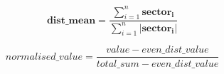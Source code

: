 \documentclass[12pt]{article}
\begin{document}
\begin{equation}
\boldsymbol{dist\_mean} = \frac{\sum_{i=1}^{n} \boldsymbol{sector_i}}{\sum_{i=1}^{n} {|\boldsymbol{sector_i}|}}
\end{equation}

\begin{equation}
  normalised\_value = \frac{value - even\_dist\_value}{total\_sum - even\_dist\_value}
\end{equation}
\end{document}
